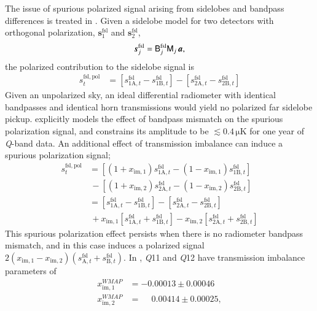 \documentclass[twocolumn]{aa}
\newcommand{\A}[0]{\mathrm{A}}
\newcommand{\B}[0]{\mathrm{B}}
\newcommand{\Q}[0]{\textit Q}
\begin{document}
The issue of spurious polarized signal arising from sidelobes and bandpass differences is treated in \citet{barnes2003}. Given a sidelobe model for two detectors with orthogonal polarization, $\boldsymbol s^\mathrm{fsl}_1$ and $\boldsymbol s^\mathrm{fsl}_2$, 
\begin{equation}
	\boldsymbol s_{j}^\mathrm{fsl}=\mathsf{B}_j^\mathrm{fsl}
	\mathsf M_j\,\boldsymbol a,
\end{equation}
the polarized contribution to the sidelobe signal is
\begin{equation}
	\begin{split}
	s^\mathrm{fsl,pol}_t
		&=[s_{1\A,t}^\mathrm{fsl}-s_{1\B,t}^\mathrm{fsl}]
		-[s_{2\A,t}^\mathrm{fsl}-s_{2\B,t}^\mathrm{fsl}]
	\end{split}
\end{equation}
Given an unpolarized sky, an ideal differential radiometer with identical
bandpasses and identical horn transmissions would yield no polarized far
sidelobe pickup. \citet{barnes2003} explicitly models the effect of bandpass
mismatch on the spurious polarization signal, and constrains its amplitude to be
$\lesssim0.4\,\mathrm{\mu K}$ for one year of \Q-band data. An additional
effect of transmission imbalance can induce a spurious polarization signal;
\begin{equation}
	\begin{split}
		s^\mathrm{fsl,pol}_t&=
		[(1+x_\mathrm{im,1})s^\mathrm{fsl}_{1\A,t}-(1-x_\mathrm{im,1})s^\mathrm{fsl}_{1\B,t}]
		\\
		&\,-[(1+x_\mathrm{im,2})s^\mathrm{fsl}_{2\A,t}-(1-x_\mathrm{im,2})s^\mathrm{fsl}_{2\B,t}]
		\\
		&=[s_{1\A,t}^\mathrm{fsl}-s_{1\B,t}^\mathrm{fsl}]
		-[s_{2\A,t}^\mathrm{fsl}-s_{2\B,t}^\mathrm{fsl}]
		\\
		&\,+x_\mathrm{im,1}[s_{1\A,t}^\mathrm{fsl}+s_{1\B,t}^\mathrm{fsl}]
		-x_\mathrm{im,2}[s_{2\A,t}^\mathrm{fsl}+s_{2\B,t}^\mathrm{fsl}]
	\end{split}
\end{equation}
This spurious polarization effect persists when there is no radiometer bandpass
mismatch, and in this case induces a polarized signal
$2(x_\mathrm{im,1}-x_\mathrm{im,2})(s_{\A,t}^\mathrm{fsl}+s_{\B,t}^\mathrm{fsl})$. In \citet{bennett2012},
\Q11 and \Q12 have transmission imbalance parameters of 
\begin{align}
	x_\mathrm{im,1}^\mathit{WMAP}&=-0.00013\pm0.00046
	\\
	x_\mathrm{im,2}^\mathit{WMAP}&=\phantom{-}0.00414\pm0.00025,
\end{align}
\end{document}
